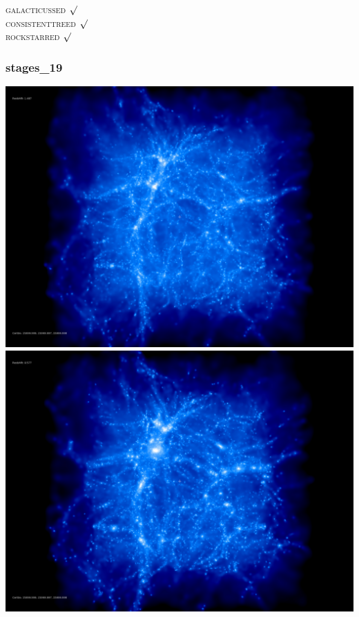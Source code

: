 \textsc{galacticussed} $\surd$ \\
\textsc{consistenttreed} $\surd$ \\ 
\textsc{rockstarred} $\surd$

% 
%
%
%
%
%
%
%

\newpage
\subsubsection{stages\_19}

\includegraphics[scale=0.1]{r256/h100/stages_19/50.jpg} 
\includegraphics[scale=0.1]{r256/h100/stages_19/100.jpg}  \\

